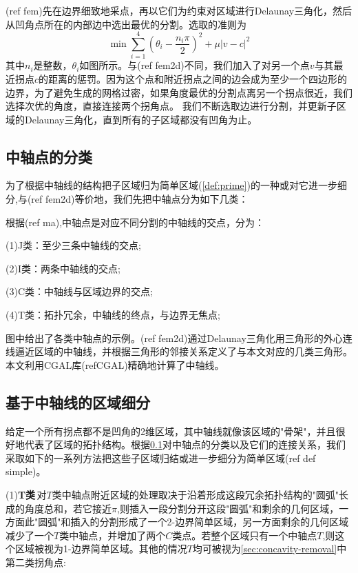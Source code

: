 (ref fem)先在边界细致地采点，再以它们为约束对区域进行Delaunay三角化，然后从凹角点所在的内部边中选出最优的分割。选取的准则为
\begin{equation} \label{equ:split-concave}
\min \sum_{i=1}^{4}(\theta_i-\frac{n_i\pi}{2})^2+\mu \left |v-c\right |^2
\end{equation}
其中$n_i$是整数，$\theta_i$如图所示。与(ref fem2d)不同，我们加入了对另一个点$v$与其最近拐点$c$的距离的惩罚。因为这个点和附近拐点之间的边会成为至少一个四边形的边界，为了避免生成的网格过密，如果角度最优的分割点离另一个拐点很近，我们选择次优的角度，直接连接两个拐角点。  
我们不断选取边进行分割，并更新子区域的Delaunay三角化，直到所有的子区域都没有凹角为止。
\subsection{中轴点的分类}\label{sec:classify-mv}
为了根据中轴线的结构把子区域归为简单区域(\ref{def:prime})的一种或对它进一步细分,与(ref fem2d)等价地，我们先把中轴点分为如下几类：
\begin{definition} \label{medial-vertex}
	根据(ref ma),中轴点是对应不同分割的中轴线的交点，分为：
	
		(1)J类：至少三条中轴线的交点;
		
		(2)I类：两条中轴线的交点;
		
		(3)C类：中轴线与区域边界的交点;
		
		(4)T类：拓扑冗余，中轴线的终点，与边界无焦点;
\end{definition}
图中给出了各类中轴点的示例。(ref fem2d)通过Delaunay三角化用三角形的外心连线逼近区域的中轴线，并根据三角形的邻接关系定义了与本文对应的几类三角形。本文利用CGAL库(refCGAL)精确地计算了中轴线。 
\subsection{基于中轴线的区域细分}\label{ma-prime}
给定一个所有拐点都不是凹角的2维区域，其中轴线就像该区域的"骨架"，并且很好地代表了区域的拓扑结构。根据\ref{sec:classify-mv}对中轴点的分类以及它们的连接关系，我们采取如下的一系列方法把这些子区域归结或进一步细分为简单区域(ref def simple)。

(1)\textbf{T类}\,对$T$类中轴点附近区域的处理取决于沿着形成这段冗余拓扑结构的"圆弧"长成的角度总和，若它接近$\pi$,则插入一段分割分开这段"圆弧"和剩余的几何区域，一方面此"圆弧"和插入的分割形成了一个2-边界简单区域，另一方面剩余的几何区域减少了一个$T$类中轴点，并增加了两个$C$类点。若整个区域只有一个中轴点$T$,则这个区域被视为1-边界简单区域。其他的情况$T$均可被视为\ref{sec:concavity-removal}中第二类拐角点:


